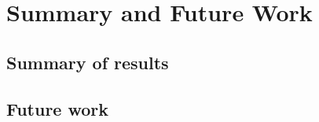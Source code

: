 \renewcommand*\chappic{}
\renewcommand*\chapquote{}
\chapter{Summary and Future Work}
\label{ch:summary}
%
\section{Summary of results}

\section{Future work}
